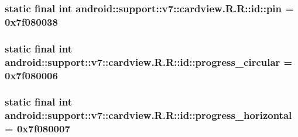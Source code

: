 \hypertarget{classandroid_1_1support_1_1v7_1_1cardview_1_1_r_1_1id_3e7120260fd32973e1e96914d736b472}{
\subsubsection[{pin}]{\setlength{\rightskip}{0pt plus 5cm}static final int android::support::v7::cardview.R.R::id::pin = 0x7f080038}}
\label{classandroid_1_1support_1_1v7_1_1cardview_1_1_r_1_1id_3e7120260fd32973e1e96914d736b472}


\hypertarget{classandroid_1_1support_1_1v7_1_1cardview_1_1_r_1_1id_9b9c5b6fd94735919f5ac8396676d7f2}{
\subsubsection[{progress\_\-circular}]{\setlength{\rightskip}{0pt plus 5cm}static final int android::support::v7::cardview.R.R::id::progress\_\-circular = 0x7f080006}}
\label{classandroid_1_1support_1_1v7_1_1cardview_1_1_r_1_1id_9b9c5b6fd94735919f5ac8396676d7f2}


\hypertarget{classandroid_1_1support_1_1v7_1_1cardview_1_1_r_1_1id_2bb83e4520f1c1ee005e59239d17da26}{
\subsubsection[{progress\_\-horizontal}]{\setlength{\rightskip}{0pt plus 5cm}static final int android::support::v7::cardview.R.R::id::progress\_\-horizontal = 0x7f080007}}
\label{classandroid_1_1support_1_1v7_1_1cardview_1_1_r_1_1id_2bb83e4520f1c1ee005e59239d17da26}


